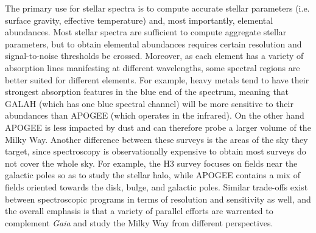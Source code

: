 The primary use for stellar spectra is to compute accurate stellar parameters (i.e. surface gravity, effective temperature) and, most importantly, elemental abundances. Most stellar spectra are sufficient to compute aggregate stellar parameters, but to obtain elemental abundances requires certain resolution and signal-to-noise thresholds be crossed. Moreover, as each element has a variety of absorption lines manifesting at different wavelengths, some spectral regions are better suited for different elements. For example, heavy metals tend to have their strongest absorption features in the blue end of the spectrum, meaning that GALAH (which has one blue spectral channel) will be more sensitive to their abundances than APOGEE (which operates in the infrared). On the other hand APOGEE is less impacted by dust and can therefore probe a larger volume of the Milky Way. Another difference between these surveys is the areas of the sky they target, since spectroscopy is observationally expensive to obtain most surveys do not cover the whole sky. For example, the H3 survey focuses on fields near the galactic poles so as to study the stellar halo, while APOGEE contains a mix of fields oriented towards the disk, bulge, and galactic poles. Similar trade-offs exist between spectroscopic programs in terms of resolution and sensitivity as well, and the overall emphasis is that a variety of parallel efforts are warrented to complement \textit{Gaia} and study the Milky Way from different perspectives.

